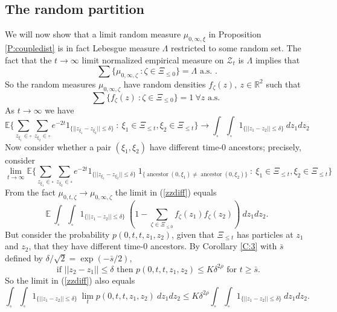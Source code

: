 \documentclass[12pt]{article}
\newcommand{\ZZ}{\mbox{${\mathcal Z}$}}
\newcommand{\Reals}{{\mathbb{R}}}
\newcommand{\Ex}{{\mathbb E}}
\newcommand{\indic}{1}
\DeclareMathOperator{\ancestor}{ancestor}
\begin{document}
 \subsection{The random partition}
 We  will now show that a limit random measure $\mu_{0,\infty,\xi}$ in Proposition  \ref{P:coupledist}
 is in fact Lebesgue measure $\Lambda$ restricted to some random set.
 The fact that the $t \to \infty$ limit normalized empirical measure on $\ZZ_t$ is $\Lambda$ implies that 
 \[ \sum \{ \mu_{0,\infty, \zeta} \  : \zeta \in \Xi_{\le 0}  \} = \Lambda  \mbox{ a.s. } .\]
So the random measures $\mu_{0,\infty, \zeta}$ have random densities $f_\zeta(z), \ z \in \Reals^2$ 
 such that
 \[ \sum  \{ f_\zeta(z) \ : \zeta \in \Xi_{\le 0}  \} = 1 \ \forall z \mbox{ a.s. } \]
As $t \to \infty$ we have
 \[
 \Ex \{ \sum_{z_{\xi_1} \in \square} \sum_{z_{\xi_2} \in \square} e^{-2t} \indic_{ \{||z_{\xi_1} - z_{\xi_2}||   \le \delta\}} \ : \ 
 \xi_1 \in \Xi_{\le t},  \xi_2 \in \Xi_{\le t} \}
 \to \int_\square \int_\square  \indic_{ \{ ||z_1-z_2|| \le \delta\} } \ dz_1 dz_2  
 \]
 Now consider whether a pair $(\xi_1,\xi_2)$ have different time-$0$ ancestors; precisely, consider
 \begin{equation}
  \lim_{t \to \infty} 
 \Ex \{ \sum_{z_{\xi_1} \in \square} \sum_{z_{\xi_2} \in \square} e^{-2t} \indic_{ \{||z_{\xi_1} - z_{\xi_2}||   \le \delta\}}
 \ \indic_{ \{   \ancestor(0, \xi_1) \neq \ancestor(0,\xi_2) \} }     \ : \ 
 \xi_1 \in \Xi_{\le t},  \xi_2 \in \Xi_{\le t} \}
 \label{zzdiff}
 \end{equation}
 From the fact 
 $\mu_{0,t,\zeta} \to \mu_{0, \infty, \zeta}$
 the limit in (\ref{zzdiff})  equals
 \begin{equation}
   \Ex \  \int_\square \int_\square  \indic_{ \{ ||z_1-z_2|| \le \delta\} } \     \left(1 - \sum_{\zeta \in \Xi_{\le 0}   } f_\zeta(z_1) f_\zeta(z_2)    \right)              \ dz_1 dz_2  . 
   \label{eq39a}
   \end{equation}
 But consider the probability
 $p(0,t,t,z_1,z_2)$,  given that $\Xi_{\le t}$ has particles at $z_1$ and $z_2$, that
 they have  different time-$0$ ancestors.
 By Corollary \ref{C:3} with $\bar{s}$ defined by $\delta/\sqrt{2} = \exp(- \bar{s}/2)$,
 \[ \mbox{ if } ||z_2-z_1|| \le \delta \mbox{ then } p(0,t,t,z_1,z_2) \le K \delta^{2 \rho} \mbox{ for } t \ge \bar{s} . \]
 So the limit in (\ref{zzdiff}) also equals
 \begin{equation}
  \int_\square \int_\square  \indic_{ \{ ||z_1-z_2|| \le \delta\} } \ \lim_t p(0,t,t,z_1,z_2)  \ dz_1 dz_2 
 \le     K \delta^{2 \rho}   \int_\square \int_\square  \indic_{ \{ ||z_1-z_2|| \le \delta\} }   \ dz_1 dz_2  .
 \label{eq39b}
 \end{equation}
\end{document}
